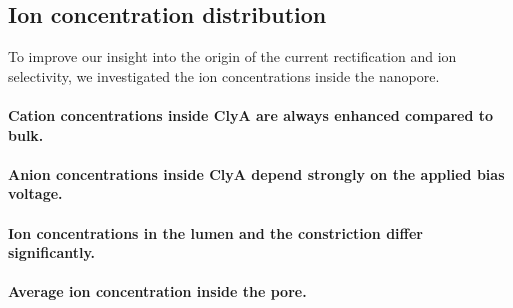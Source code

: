 \documentclass[journal=ancac3, manuscript=article, etalmode=truncate,maxauthors=0]{achemso}
\begin{document}
\subsection{Ion concentration distribution}
%
To improve our insight into the origin of the current rectification and ion selectivity, we investigated the ion concentrations inside the nanopore.


\paragraph{Cation concentrations inside ClyA are always enhanced compared to bulk.}

\paragraph{Anion concentrations inside ClyA depend strongly on the applied bias voltage.}

\paragraph{Ion concentrations in the lumen and the constriction differ significantly.}

\paragraph{Average ion concentration inside the pore.}




%
\end{document}
